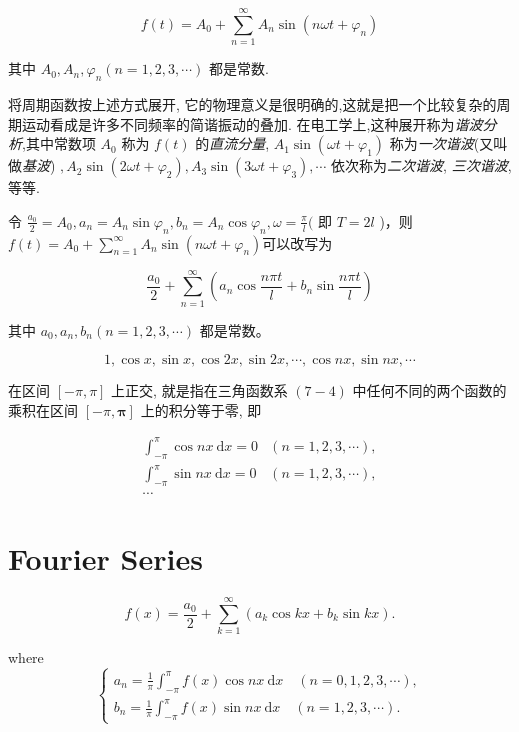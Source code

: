 $$ f(t)=A_{0}+\sum_{n=1}^{\infty} A_{n} \sin \left(n \omega t+\varphi_{n}\right) $$

其中 $ A_{0}, A_{n}, \varphi_{n}(n=1,2,3, \cdots) $ 都是常数.

将周期函数按上述方式展开, 它的物理意义是很明确的,这就是把一个比较复杂的周期运动看成是许多不同频率的简谐振动的叠加. 在电工学上,这种展开称为\textit{谐波分析},其中常数项 $ A_{0} $ 称为 $ f(t) $ 的\textit{直流分量}, $ A_{1} \sin \left(\omega t+\varphi_{1}\right) $ 称为\textit{一次谐波}(又叫做\textit{基波}) $ , A_{2} \sin \left(2 \omega t+\varphi_{2}\right), A_{3} \sin \left(3 \omega t+\varphi_{3}\right), \cdots $ 依次称为\textit{二次谐波}, \textit{三次谐波},等等.

\begin{definition}[三角级数]
    令 $ \frac{a_{0}}{2}=A_{0}, a_{n}=A_{n} \sin \varphi_{n}, b_{n}=A_{n} \cos \varphi_{n}, \omega=\frac{\pi}{l}( $ 即 $ T=2 l $ )，则$ f(t)=A_{0}+\sum_{n=1}^{\infty} A_{n} \sin \left(n \omega t+\varphi_{n}\right) $可以改写为

    $$ \frac{a_{0}}{2}+\sum_{n=1}^{\infty}\left(a_{n} \cos \frac{n \pi t}{l}+b_{n} \sin \frac{n \pi t}{l}\right) $$

    其中 $ a_{0}, a_{n}, b_{n}(n=1,2,3, \cdots) $ 都是常数。
\end{definition}

\begin{definition}[三角函数系]
    $$ 1, \cos x, \sin x, \cos 2 x, \sin 2 x, \cdots, \cos n x, \sin n x, \cdots $$

    在区间 $ [-\pi, \pi] $ 上正交, 就是指在三角函数系 $ (7-4) $ 中任何不同的两个函数的 乘积在区间 $ [-\pi, \boldsymbol{\pi}] $ 上的积分等于零, 即

    $$ \begin{array}{ll}\int_{-\pi}^{\pi} \cos n x \mathrm{~d} x=0 & (n=1,2,3, \cdots), \\ \int_{-\pi}^{\pi} \sin n x \mathrm{~d} x=0 & (n=1,2,3, \cdots),\\ \cdots
    \end{array} $$
\end{definition}

\section{Fourier Series}

\begin{definition}[傅里叶级数]
    $$
f(x)=\frac{a_{0}}{2}+\sum_{k=1}^{\infty}\left(a_{k} \cos k x+b_{k} \sin k x\right) .
$$

where $$ \left\{\begin{array}{l}a_{n}=\frac{1}{\pi} \int_{-\pi}^{\pi} f(x) \cos n x \mathrm{~d} x \quad(n=0,1,2,3, \cdots), \\ b_{n}=\frac{1}{\pi} \int_{-\pi}^{\pi} f(x) \sin n x \mathrm{~d} x \quad(n=1,2,3, \cdots) .\end{array}\right. $$
\end{definition}

